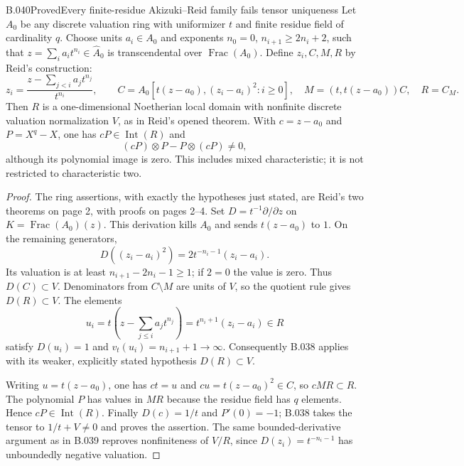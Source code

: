 \begin{saresult}{B.040}{Proved}{Every finite-residue Akizuki--Reid family fails tensor uniqueness}
Let $A_0$ be any discrete valuation ring with uniformizer $t$ and
finite residue field of cardinality $q$. Choose units $a_i\in A_0$
and exponents $n_0=0$, $n_{i+1}\ge2n_i+2$, such that
$z=\sum_i a_it^{n_i}\in\widehat A_0$ is transcendental over
$\operatorname{Frac}(A_0)$. Define $z_i,C,M,R$ by Reid's construction:
\[
 z_i=\frac{z-\sum_{j<i}a_jt^{n_j}}{t^{n_i}},\qquad
 C=A_0[t(z-a_0),(z_i-a_i)^2:i\ge0],\quad
 M=(t,t(z-a_0))C,\quad R=C_M.
\]
Then $R$ is a one-dimensional Noetherian local domain with
nonfinite discrete valuation normalization $V$, as in Reid's
opened theorem. With $c=z-a_0$ and $P=X^q-X$, one has
$cP\in\operatorname{Int}(R)$ and
\[
 (cP)\otimes P-P\otimes(cP)\ne0,
\]
although its polynomial image is zero. This includes mixed
characteristic; it is not restricted to characteristic two.
\end{saresult}
\begin{proof}
The ring assertions, with exactly the hypotheses just stated,
are Reid's two theorems on page 2, with proofs on pages 2--4.
Set $D=t^{-1}\partial/\partial z$ on
$K=\operatorname{Frac}(A_0)(z)$. This derivation kills $A_0$
and sends $t(z-a_0)$ to $1$. On the remaining generators,
\[
 D((z_i-a_i)^2)=2t^{-n_i-1}(z_i-a_i).
\]
Its valuation is at least
$n_{i+1}-2n_i-1\ge1$; if $2=0$ the value is zero.
Thus $D(C)\subset V$. Denominators from $C\setminus M$ are
units of $V$, so the quotient rule gives $D(R)\subset V$.
The elements
\[
 u_i=t\left(z-\sum_{j\le i}a_jt^{n_j}\right)
      =t^{n_i+1}(z_i-a_i)\in R
\]
satisfy $D(u_i)=1$ and $v_t(u_i)=n_{i+1}+1\to\infty$.
Consequently B.038 applies with its weaker, explicitly stated
hypothesis $D(R)\subset V$.

Writing $u=t(z-a_0)$, one has $ct=u$ and
$cu=t(z-a_0)^2\in C$, so $cMR\subset R$.
The polynomial $P$ has values in $MR$ because the residue field
has $q$ elements. Hence $cP\in\operatorname{Int}(R)$.
Finally $D(c)=1/t$ and $P'(0)=-1$; B.038 takes the tensor to
$1/t+V\ne0$ and proves the assertion.
The same bounded-derivative argument as in B.039 reproves
nonfiniteness of $V/R$, since $D(z_i)=t^{-n_i-1}$ has
unboundedly negative valuation.
\end{proof}

